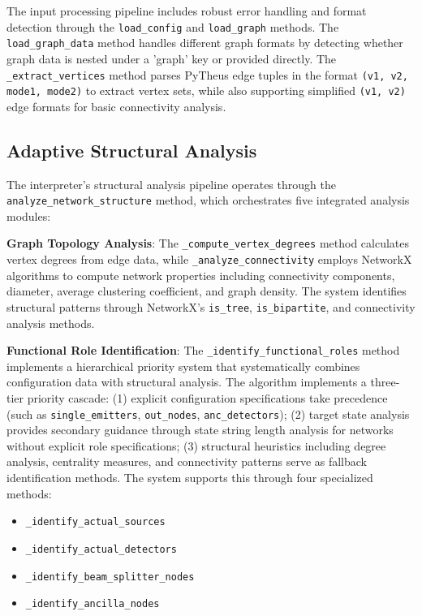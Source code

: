 \documentclass[11pt,a4paper]{article}
\begin{document}
The input processing pipeline includes robust error handling and format detection through the \texttt{load\_config} and \texttt{load\_graph} methods. The \texttt{load\_graph\_data} method handles different graph formats by detecting whether graph data is nested under a 'graph' key or provided directly. The \texttt{\_extract\_vertices} method parses PyTheus edge tuples in the format \texttt{(v1, v2, mode1, mode2)} to extract vertex sets, while also supporting simplified \texttt{(v1, v2)} edge formats for basic connectivity analysis.

\subsection{Adaptive Structural Analysis}

The interpreter's structural analysis pipeline operates through the \texttt{analyze\_network\_structure} method, which orchestrates five integrated analysis modules:

\textbf{Graph Topology Analysis}: The \texttt{\_compute\_vertex\_degrees} method calculates vertex degrees from edge data, while \texttt{\_analyze\_connectivity} employs NetworkX algorithms to compute network properties including connectivity components, diameter, average clustering coefficient, and graph density. The system identifies structural patterns through NetworkX's \texttt{is\_tree}, \texttt{is\_bipartite}, and connectivity analysis methods.

\textbf{Functional Role Identification}: The \texttt{\_identify\_functional\_roles} method implements a hierarchical priority system that systematically combines configuration data with structural analysis. The algorithm implements a three-tier priority cascade: (1) explicit configuration specifications take precedence (such as \texttt{single\_emitters}, \texttt{out\_nodes}, \texttt{anc\_detectors}); (2) target state analysis provides secondary guidance through state string length analysis for networks without explicit role specifications; (3) structural heuristics including degree analysis, centrality measures, and connectivity patterns serve as fallback identification methods. The system supports this through four specialized methods: 
\begin{itemize}
\item \texttt{\_identify\_actual\_sources}
\item \texttt{\_identify\_actual\_detectors}
\item \texttt{\_identify\_beam\_splitter\_nodes}
\item \texttt{\_identify\_ancilla\_nodes}
\end{itemize}
\end{document}
